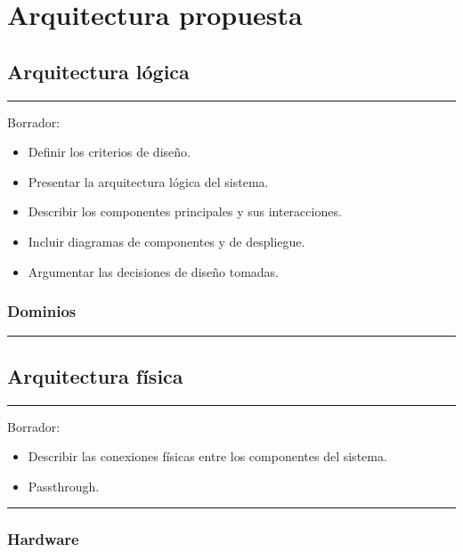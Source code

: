 \chapter{Arquitectura propuesta}

\section{Arquitectura lógica}

\noindent\rule{\textwidth}{0.4pt}

Borrador:

\begin{itemize}
    \item Definir los criterios de diseño.
    \item Presentar la arquitectura lógica del sistema.
    \item Describir los componentes principales y sus interacciones.
    \item Incluir diagramas de componentes y de despliegue.
    \item Argumentar las decisiones de diseño tomadas.
\end{itemize}

\subsection{Dominios}

\noindent\rule{\textwidth}{0.4pt}



\section{Arquitectura física}

\noindent\rule{\textwidth}{0.4pt}
Borrador:

\begin{itemize}
    \item Describir las conexiones físicas entre los componentes del sistema.
    \item Passthrough.
\end{itemize}

\noindent\rule{\textwidth}{0.4pt}

\subsection{Hardware}

\clearpage
